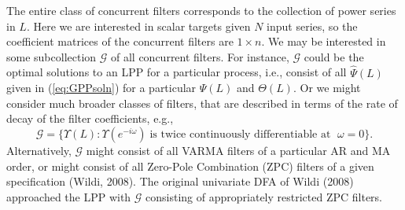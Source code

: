 \documentclass[a4paper]{book}
\begin{document}
 The entire class of concurrent filters corresponds to 
  the collection of power series in $L$.  Here we are interested in 
 scalar targets given $N$ input series, so the coefficient matrices of the
 concurrent filters are $1 \times n$.  We may be interested in some subcollection
 $\mathcal{G}$ of all concurrent filters.  For instance, $\mathcal{G}$ could
 be the optimal solutions to an LPP for a particular process, i.e., consist of
 all $\widehat{\Psi} (L)$ given in (\ref{eq:GPPsoln}) for a particular $\Psi (L)$ and
 $\Theta (L)$.  Or we might consider much broader classes of filters, that are 
 described in terms of the rate of decay of the filter coefficients, e.g.,
\[
  \mathcal{G} = \{ \Upsilon (L) : \Upsilon (e^{-i \omega}) \;
  \mbox{is twice continuously differentiable at } \; \omega = 0 \}.
\]
  Alternatively, $\mathcal{G}$ might consist of all VARMA filters of a
 particular AR and MA order, or might consist of all Zero-Pole
 Combination (ZPC) filters of a given specification (Wildi, 2008).
 The original univariate DFA of Wildi (2008) approached the LPP with
 $\mathcal{G}$ consisting of appropriately restricted ZPC filters.
\end{document}
